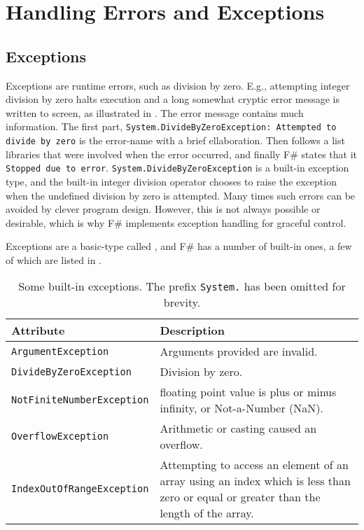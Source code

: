 \documentclass[fsharpNotes.tex]{subfiles}
\begin{document}
\chapter{Handling Errors and Exceptions}
\label{chap:errors}

\section{Exceptions}
\label{sec:exceptions}
Exceptions are runtime errors, such as division by zero. E.g., attempting integer division by zero halts execution and a long somewhat cryptic error message is written to screen, as illustrated in .
%
%
The error message contains much information. The first part, \lstinline[language=console]{System.DivideByZeroException: Attempted to divide by zero} is the error-name with a brief ellaboration. Then follows a list libraries that were involved when the error occurred, and finally F\# states that it \lstinline[language=console]{Stopped due to error}. \lstinline{System.DivideByZeroException} is a built-in exception type, and the built-in integer division operator chooses to raise the exception when the undefined division by zero is attempted. Many times such errors can be avoided by clever program design. However, this is not always possible or desirable, which is why F\# implements exception handling for graceful control.

Exceptions are a basic-type called , and F\# has a number of built-in ones, a few of which are listed in .
\begin{table}
  \centering
  \begin{tabularx}{\linewidth}{|l|X|}
    \hline
    \rowcolor{headerRowColor} Attribute & Description\\
    \hline
    \lstinline!ArgumentException! & Arguments provided are invalid.\\
    \hline
    \lstinline!DivideByZeroException! & Division by zero.\\
    \hline
    \lstinline!NotFiniteNumberException! & floating point value is plus or minus infinity, or Not-a-Number (NaN).\\
    \hline
    \lstinline!OverflowException! & Arithmetic or casting caused an overflow.\\
    \hline
    \lstinline!IndexOutOfRangeException! & Attempting to access an element of an array using an index which is less than zero or equal or greater than the length of the array.\\
    \hline
  \end{tabularx}
  \caption{Some built-in exceptions. The prefix \lstinline{System.} has been omitted for brevity.}
  \label{tab:exceptions}
\end{table}
\end{document}
